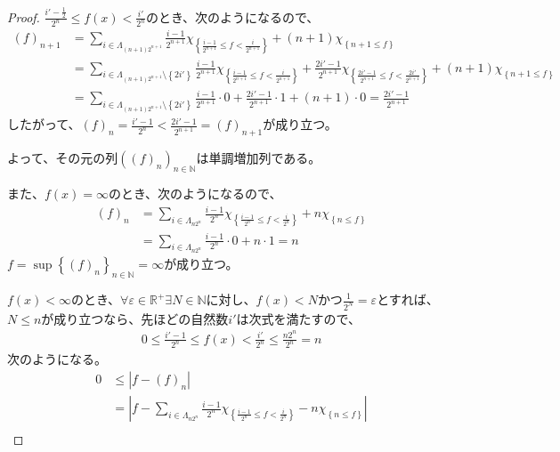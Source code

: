 \documentclass[dvipdfmx]{jsarticle}
\begin{document}
\begin{proof}
$\frac{i' - \frac{1}{2}}{2^{n}} \leq f(x) < \frac{i'}{2^{n}}$のとき、次のようになるので、
\begin{align*}
(f)_{n + 1} &= \sum_{i \in \varLambda_{(n + 1)2^{n + 1}}} {\frac{i - 1}{2^{n + 1}}\chi_{\left\{ \frac{i - 1}{2^{n + 1}} \leq f < \frac{i}{2^{n + 1}} \right\}}} + (n + 1)\chi_{\left\{ n + 1 \leq f \right\}}\\
&= \sum_{i \in \varLambda_{(n + 1)2^{n + 1}} \setminus \left\{ 2i' \right\}} {\frac{i - 1}{2^{n + 1}}\chi_{\left\{ \frac{i - 1}{2^{n + 1}} \leq f < \frac{i}{2^{n + 1}} \right\}}} + \frac{2i' - 1}{2^{n + 1}}\chi_{\left\{ \frac{2i' - 1}{2^{n + 1}} \leq f < \frac{2i'}{2^{n + 1}} \right\}} + (n + 1)\chi_{\left\{ n + 1 \leq f \right\}}\\
&= \sum_{i \in \varLambda_{(n + 1)2^{n + 1}} \setminus \left\{ 2i' \right\}} {\frac{i - 1}{2^{n + 1}} \cdot 0} + \frac{2i' - 1}{2^{n + 1}} \cdot 1 + (n + 1) \cdot 0 = \frac{2i' - 1}{2^{n + 1}}
\end{align*}
したがって、$(f)_{n} = \frac{i' - 1}{2^{n}} < \frac{2i' - 1}{2^{n + 1}} = (f)_{n + 1}$が成り立つ。\par
よって、その元の列$\left( (f)_{n} \right)_{n \in \mathbb{N}}$は単調増加列である。\par
また、$f(x) = \infty$のとき、次のようになるので、
\begin{align*}
(f)_{n} &= \sum_{i \in \varLambda_{n2^{n}}} {\frac{i - 1}{2^{n}}\chi_{\left\{ \frac{i - 1}{2^{n}} \leq f < \frac{i}{2^{n}} \right\}}} + n\chi_{\left\{ n \leq f \right\}}\\
&= \sum_{i \in \varLambda_{n2^{n}}} {\frac{i - 1}{2^{n}} \cdot 0} + n \cdot 1 = n
\end{align*}
$f = \sup\left\{ (f)_{n} \right\}_{n \in \mathbb{N}} = \infty$が成り立つ。\par
$f(x) < \infty$のとき、$\forall\varepsilon \in \mathbb{R}^{+}\exists N \in \mathbb{N}$に対し、$f(x) < N$かつ$\frac{1}{2^{N}} = \varepsilon$とすれば、$N \leq n$が成り立つなら、先ほどの自然数$i'$は次式を満たすので、
\begin{align*}
0 \leq \frac{i' - 1}{2^{n}} \leq f(x) < \frac{i'}{2^{n}} \leq \frac{n2^{n}}{2^{n}} = n
\end{align*}
次のようになる。
\begin{align*}
0 &\leq \left| f - (f)_{n} \right|\\
&= \left| f - \sum_{i \in \varLambda_{n2^{n}}} {\frac{i - 1}{2^{n}}\chi_{\left\{ \frac{i - 1}{2^{n}} \leq f < \frac{i}{2^{n}} \right\}}} - n\chi_{\left\{ n \leq f \right\}} \right|\\

\end{align*}
\end{proof}
\end{document}
